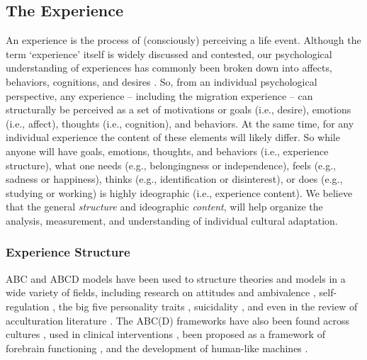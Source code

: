 \documentclass[man, 12pt, a4paper]{apa7}
\begin{document}
\subsection{The Experience}
An experience is the process of (consciously) perceiving a life event. Although the term `experience' itself is widely discussed and contested, our psychological understanding of experiences has commonly been broken down into affects, behaviors, cognitions, and desires \citep[e.g.,][sometimes referred to as the ABCs or ABCDs of psychology]{Cottam2010, Hogg2005, Jhangiani2014}. So, from an individual psychological perspective, any experience -- including the migration experience -- can structurally be perceived as a set of motivations or goals (i.e., desire), emotions (i.e., affect), thoughts (i.e., cognition), and behaviors. At the same time, for any individual experience the content of these elements will likely differ. So while anyone will have goals, emotions, thoughts, and behaviors (i.e., experience structure), what one needs (e.g., belongingness or independence), feels (e.g., sadness or happiness), thinks (e.g., identification or disinterest), or does (e.g., studying or working) is highly ideographic (i.e., experience content). We believe that the general \textit{structure} and ideographic \textit{content}, will help organize the analysis, measurement, and understanding of individual cultural adaptation.

\subsubsection{Experience Structure}
ABC and ABCD models have been used to structure theories and models in a wide variety of fields, including research on attitudes \citep{Breckler1984} and ambivalence \citep{VanHarreveld2015}, self-regulation \citep{Ben-Eliyahu2015}, the big five personality traits \citep{Wilt2016}, suicidality \citep{Harris2015}, and even in the review of acculturation literature \citep{Ward2001, Ward2019}. The ABC(D) frameworks have also been found across cultures \citep[e.g.,][]{Bhawuk2011}, used in clinical interventions \citep{Eifert1989}, been proposed as a framework of forebrain functioning \citep{Swanson2020}, and the development of human-like machines \citep{Guo2020}.
\end{document}
